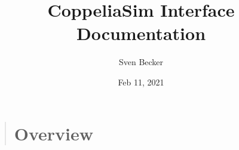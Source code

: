 \documentclass[letterpaper,10pt,english]{sphinxmanual}
\title{CoppeliaSim Interface Documentation}
\date{Feb 11, 2021}
\author{Sven Becker}
\begin{document}
\maketitle
\sphinxtableofcontents
{}\label{\detokenize{index::doc}}

\begin{quote}

\begin{figure}[htbp]
\centering
\capstart

\noindent{}
\caption{\sphinxfootnotemark[1]}\label{\detokenize{index:id3}}\end{figure}
%
\begin{footnotetext}[1]\sphinxAtStartFootnote
{}
%
\end{footnotetext}\ignorespaces 

\chapter{Overview}
\label{\detokenize{Overview:overview}}\label{\detokenize{Overview::doc}}\label{\detokenize{Overview:coppeliasim-interface-s-documentation}}
\begin{figure}[htbp]
\centering

\noindent{}
\end{figure}


\end{quote}
\end{document}
